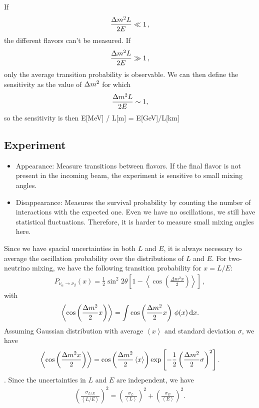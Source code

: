 \documentclass[twocolumn]{article}
\newcommand{\na}{\ensuremath{\nu_\alpha}}
\newcommand{\nb}{\ensuremath{\nu_\beta}}
\newcommand{\avg}[1]{\ensuremath{\left\langle {#1} \right \rangle}}
\newcommand*{\dm}[1][]{%
  \Delta m^2\ifx\\#1\\\else_\text{#1}\fi
}
\begin{document}
If 
\begin{align*}
  \frac{\dm L}{2E} \ll 1
\,,\end{align*}
the different flavors can't be measured.
If 
\begin{align*}
  \frac{\dm L}{2E} \gg 1
\,,\end{align*}
only the average transition probability is observable. We can then define the sensitivity as the value of $\dm$ for which 
\begin{align*}
  \frac{\dm L}{2E} \sim 1
,\end{align*}
so the sensitivity is then E[MeV] / L[m] = E[GeV]/L[km]
\subsection*{Experiment}
\begin{itemize}
  \item Appearance: Measure transitions between flavors. If the final flavor is not present in the incoming beam, the experiment is sensitive to small mixing angles.
  \item Disappearance: Measures the survival probability by counting the number of interactions with the expected one. Even we have no oscillations, we still have statistical fluctuations. Therefore, it is harder to measure small mixing angles here.
\end{itemize}

Since we have spacial uncertainties in both $L$ and $E$, it is always necessary to average the oscillation probability over the distributions of $L$ and $E$. For two-neutrino mixing, we have the following transition probability for $x = L / E$:
\begin{align*}
  P_{\na \to \nb}(x) = \frac{1}{2} \sin^2 2\theta \left[1 - \left\langle \cos \left( \frac{\Delta m^2 x}{2} \right) \right\rangle \right]
\,,\end{align*}
with
\begin{align*}
  \left \langle \cos \left (\frac{\dm}{2} x \right) \right \rangle = \int \cos \left (\frac{\dm}{2} x \right ) \, \phi(x) \, \dd x
.\end{align*}
Assuming Gaussian distribution with average $\avg{x}$ and standard deviation $\sigma$, we have 
\begin{align*}
  \avg{\cos\left( \frac{\dm x}{2} \right)} = \cos\left( \frac{\dm}{2} \avg{x}\right)\exp\left[-\frac{1}{2} \left(\frac{\dm}{2}\sigma\right)^2\right]
.\end{align*}.
Since the uncertainties in $L$ and $E$ are independent, we have
\begin{align*}
  \left(\frac{\sigma_{L/E}}{\avg{L/E}}\right)^2 = \left(\frac{\sigma_L}{\avg{L}}\right)^2 + \left(\frac{\sigma_E}{\avg{E}}\right)^2 
.\end{align*}
\end{document}
